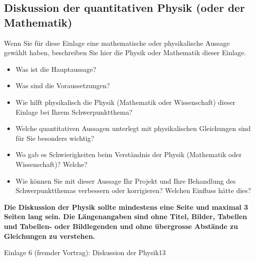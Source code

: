 \subsection{Diskussion der quantitativen Physik (oder der Mathematik)}
\begin{hinweise}
Wenn Sie für diese Einlage eine mathematische oder physikalische Aussage gewählt haben, beschreiben Sie hier
die Physik oder Mathematik dieser Einlage.
\begin{itemize}\itemsep0pt
\item Was ist die Hauptaussage?
\item Was sind die Voraussetzungen?
\item Wie hilft physikalisch die Physik (Mathematik oder Wissenschaft) dieser Einlage bei Ihrem Schwerpunktthema?
\item Welche quantitativen Aussagen unterlegt mit physikalischen Gleichungen sind für Sie besonders wichtig?
\item Wo gab es Schwierigkeiten beim Verständnis der Physik (Mathematik oder Wissenschaft)? Welche?
\item Wie können Sie mit dieser Aussage Ihr Projekt und Ihre Behandlung des Schwerpunktthemas verbessern oder korrigieren? Welchen Einfluss hätte dies?
\end{itemize}
\textbf{Die Diskussion der Physik sollte mindestens eine Seite und maximal 3 Seiten lang sein. Die
Längenangaben sind ohne Titel, Bilder, Tabellen und Tabellen- oder Bildlegenden und ohne übergrosse Abstände
zu Gleichungen zu verstehen.}
\end{hinweise}
\begin{umfang}{Einlage 6 (fremder Vortrag): Diskussion der Physik}{1}{3}
\end{umfang}

